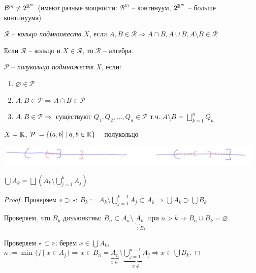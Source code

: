 \begin{remark}
    $\mathcal{B}^m\not = 2^{\mathbb{R}^m}$ (имеют разные мощности: $\mathcal{B}^m$ – континуум, $2^{\mathbb{R}^m}$ – больше континуума)
\end{remark}

\begin{definition}
    $\mathcal{R}$ – \textit{кольцо подмножеств $X$}, если $A, B\in \mathcal{R}\Rightarrow A \cap B,  A \cup B,  A \setminus B\in \mathcal{R}$
\end{definition}

\begin{remark}
    Если $\mathcal{R}$ – кольцо и $X\in \mathcal{R}$, то $\mathcal{R}$ – алгебра.
\end{remark}

\begin{definition}
    $\mathcal{P}$ – \textit{полукольцо подмножеств $X$}, если:
    \begin{enumerate}
        \item $\varnothing \in \mathcal{P}$
        \item $A, B \in \mathcal{P}\Rightarrow A \cap B \in \mathcal{P}$
        \item $A, B \in \mathcal{P}\Rightarrow$ существуют $Q_1, Q_2, ..., Q_n\in \mathcal{P}$ 
            т.ч. $A\setminus B =\bigsqcup\limits_{k=1}^n Q_k$
    \end{enumerate}
\end{definition}

\begin{example}
    $X=\mathbb{R}$, $\mathcal{P}:=\{ (a, b] \mid a, b\in \mathbb{R}\}$ – полукольцо

    \includegraphics[width=0.7\linewidth]{images/23-09-07-3.png}
\end{example}

\begin{lemma}
    $\bigcup A_k=\bigsqcup (A_k \setminus \bigcup\limits_{j=1}^k A_j)$ 
\end{lemma}

\begin{proof} Проверяем «$\supset$»: $B_k := A_k \setminus \bigcup\limits_{j=1}^{k-1} A_j \subset A_k \Rightarrow \bigcup A_k \supset \bigcup B_k$

    Проверяем, что $B_k$ дизъюнктны: $B_n \subset A_n \setminus \underbrace{A_k}_{\supset B_k}$ при $n>k\Rightarrow B_n \cup B_k = \varnothing$

    Проверяем «$\subset$»: берем $x\in \bigcup A_k$, $n:=\min \{j\mid x\in A_j\}\Rightarrow x\in B_n=\underbrace{A_n}_{x\in}\setminus \underbrace{\bigcup\limits_{j=1}^{n-1} A_j}_{x\not\in} 
    \Rightarrow x\in \bigcup B_k$.
\end{proof}

